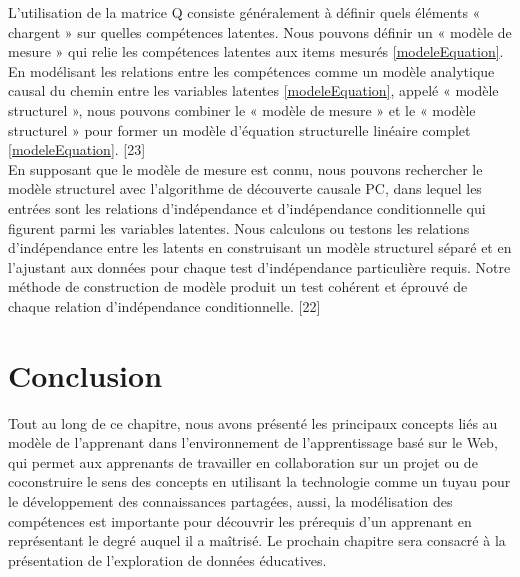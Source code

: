 L'utilisation de la matrice Q consiste généralement à définir quels éléments « chargent » sur quelles compétences latentes. Nous pouvons définir un « modèle de mesure » qui relie les compétences latentes aux items mesurés \ref{modeleEquation}. En modélisant les relations entre les compétences comme un modèle analytique causal du chemin entre les variables latentes \ref{modeleEquation}, appelé « modèle structurel », nous pouvons combiner le « modèle de mesure » et le « modèle structurel » pour former un modèle d'équation structurelle linéaire complet \ref{modeleEquation}. [23] \\
En supposant que le modèle de mesure est connu, nous pouvons rechercher le modèle structurel avec l'algorithme de découverte causale PC, dans lequel les entrées sont les relations d'indépendance et d'indépendance conditionnelle qui figurent parmi les variables latentes. Nous calculons ou testons les relations d'indépendance entre les latents en construisant un modèle structurel séparé et en l'ajustant aux données pour chaque test d'indépendance particulière requis. Notre méthode de construction de modèle produit un test cohérent et éprouvé de chaque relation d'indépendance conditionnelle. [22]

\section{Conclusion}
Tout au long de ce chapitre, nous avons présenté les principaux concepts liés au modèle de l'apprenant dans l'environnement de l'apprentissage basé sur le Web, qui permet aux apprenants de travailler en collaboration sur un projet ou de coconstruire le sens des concepts en utilisant la technologie comme un tuyau pour le développement des connaissances partagées, aussi, la modélisation des compétences est importante pour découvrir les prérequis d'un apprenant en représentant le degré auquel il a maîtrisé.
Le prochain chapitre sera consacré à la présentation de l'exploration de données éducatives.








